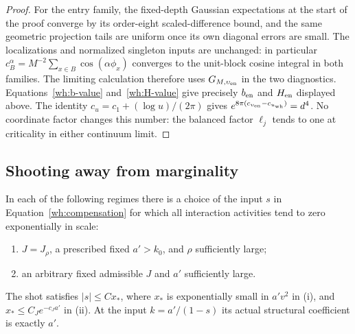 \begin{proof}
For the entry family, the fixed-depth Gaussian expectations at the
start of the proof converge by its order-eight scaled-difference
bound, and the same geometric projection tails are uniform once its
own diagonal errors are small.  The localizations and normalized
singleton inputs are unchanged: in particular
$c_B^\alpha=M^{-2}\sum_{x\in B}\cos(\alpha\phi_x)$ converges to the
unit-block cosine integral in both families.  The limiting
calculation therefore uses $G_{M,\upsilon_{\rm en}}$ in the two
diagnostics.  Equations~\eqref{wh:b-value} and~\eqref{wh:H-value}
give precisely $b_{\rm en}$ and $H_{\rm en}$ displayed above.
The identity $c_u=c_1+(\log u)/(2\pi)$ gives
$e^{8\pi(c_{\upsilon_{\rm en}}-c_{u_{\rm wh}})}=d^4$.
No coordinate factor changes this number: the balanced factor
$\ell_j$ tends to one at criticality in either continuum limit.
\end{proof}

\subsection{Shooting away from marginality}

\begin{proposition}\label{wh:gapped-shooting}
In each of the following regimes there is a choice of the input
$s$ in Equation~\eqref{wh:compensation} for which all interaction
activities tend to zero exponentially in scale:
\begin{enumerate}[label=(\roman*)]
 \item $J=J_\rho$, a prescribed fixed $a'>k_0$, and $\rho$
       sufficiently large;
 \item an arbitrary fixed admissible $J$ and $a'$ sufficiently large.
\end{enumerate}
The shot satisfies $|s|\le Cx_*$, where $x_*$ is exponentially
small in $a'v^2$ in (i), and $x_*\le C_Je^{-c_Ja'}$ in (ii).
At the input $k=a'/(1-s)$ its actual structural coefficient is
exactly $a'$.
\end{proposition}

